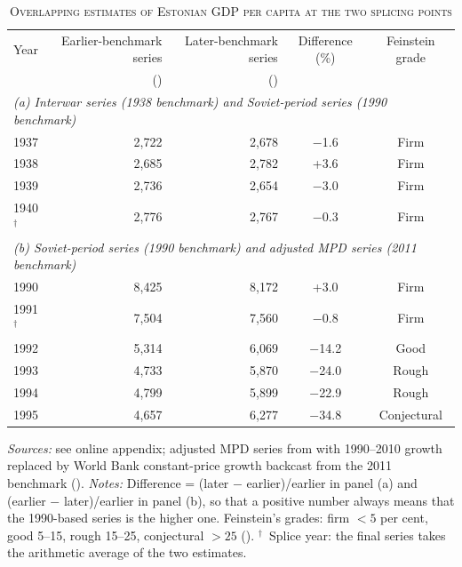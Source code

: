 \begin{table}[htbp]
\centering\small
\caption[Overlapping estimates of Estonian GDP per capita at the two splicing points]{\textsc{Overlapping estimates of Estonian GDP per capita at the two splicing points}}
\label{tab:overlaps}
\begin{threeparttable}
\begin{tabular}{lrrcc}
\toprule
Year & Earlier-benchmark series & Later-benchmark series & Difference (\%) & Feinstein grade \\
& (\intlnineteen{}) & (\intlnineteen{}) & & \\
\midrule
\multicolumn{5}{l}{\textit{(a) Interwar series (1938 benchmark) and Soviet-period series (1990 benchmark)}} \\
1937 & 2,722 & 2,678 & $-$1.6 & Firm \\
1938 & 2,685 & 2,782 & +3.6 & Firm \\
1939 & 2,736 & 2,654 & $-$3.0 & Firm \\
1940$^{\dagger}$ & 2,776 & 2,767 & $-$0.3 & Firm \\
\midrule
\multicolumn{5}{l}{\textit{(b) Soviet-period series (1990 benchmark) and adjusted MPD series (2011 benchmark)}} \\
1990 & 8,425 & 8,172 & +3.0 & Firm \\
1991$^{\dagger}$ & 7,504 & 7,560 & $-$0.8 & Firm \\
1992 & 5,314 & 6,069 & $-$14.2 & Good \\
1993 & 4,733 & 5,870 & $-$24.0 & Rough \\
1994 & 4,799 & 5,899 & $-$22.9 & Rough \\
1995 & 4,657 & 6,277 & $-$34.8 & Conjectural \\
\bottomrule
\end{tabular}
\begin{tablenotes}
\footnotesize
\textit{Sources:} see online appendix; adjusted MPD series from \cite{mpd2023} with 1990--2010 growth replaced by World Bank constant-price growth backcast from the 2011 benchmark (\cite{wdi2024}). \textit{Notes:} Difference = (later $-$ earlier)/earlier in panel (a) and (earlier $-$ later)/earlier in panel (b), so that a positive number always means that the 1990-based series is the higher one. Feinstein's grades: firm ${<}5$ per cent, good 5--15, rough 15--25, conjectural ${>}25$ (\cite[21]{feinstein1972}). $^{\dagger}$~Splice year: the final series takes the arithmetic average of the two estimates.
\end{tablenotes}
\end{threeparttable}
\end{table}
